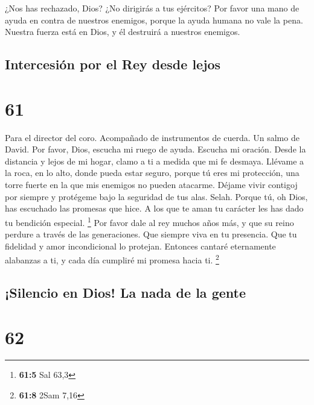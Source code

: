  ¿Nos has rechazado, Dios? ¿No dirigirás a tus ejércitos?
 Por favor una mano de ayuda en contra de nuestros
enemigos, porque la ayuda humana no vale la pena.  Nuestra
fuerza está en Dios, y él destruirá a nuestros enemigos.

\hypertarget{intercesiuxf3n-por-el-rey-desde-lejos}{%
\subsection{Intercesión por el Rey desde
lejos}\label{intercesiuxf3n-por-el-rey-desde-lejos}}

\hypertarget{section-60}{%
\section{61}\label{section-60}}

Para el director del coro. Acompañado de instrumentos de cuerda. Un
salmo de David.  Por favor, Dios, escucha mi ruego de ayuda.
Escucha mi oración.  Desde la distancia y lejos de mi hogar,
clamo a ti a medida que mi fe desmaya. Llévame a la roca, en lo alto,
donde pueda estar seguro,  porque tú eres mi protección, una
torre fuerte en la que mis enemigos no pueden atacarme. 
Déjame vivir contigoj por siempre y protégeme bajo la seguridad de tus
alas. Selah.  Porque tú, oh Dios, has escuchado las promesas
que hice. A los que te aman tu carácter les has dado tu bendición
especial. \footnote{\textbf{61:5} Sal 63,3}  Por favor dale
al rey muchos años más, y que su reino perdure a través de las
generaciones.  Que siempre viva en tu presencia. Que tu
fidelidad y amor incondicional lo protejan.  Entonces
cantaré eternamente alabanzas a ti, y cada día cumpliré mi promesa hacia
ti. \footnote{\textbf{61:8} 2Sam 7,16}

\hypertarget{silencio-en-dios-la-nada-de-la-gente}{%
\subsection{¡Silencio en Dios! La nada de la
gente}\label{silencio-en-dios-la-nada-de-la-gente}}

\hypertarget{section-61}{%
\section{62}\label{section-61}}

